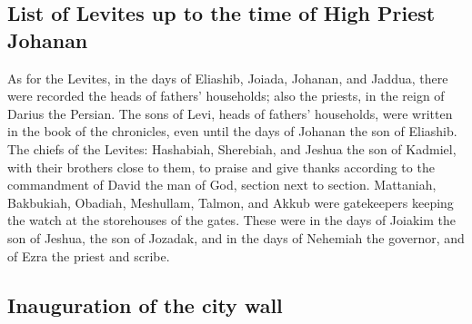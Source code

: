 \hypertarget{list-of-levites-up-to-the-time-of-high-priest-johanan}{%
\subsection{List of Levites up to the time of High Priest
Johanan}\label{list-of-levites-up-to-the-time-of-high-priest-johanan}}

 As for the Levites, in the days of Eliashib, Joiada,
Johanan, and Jaddua, there were recorded the heads of fathers'
households; also the priests, in the reign of Darius the Persian.
 The sons of Levi, heads of fathers' households, were
written in the book of the chronicles, even until the days of Johanan
the son of Eliashib.  The chiefs of the Levites:
Hashabiah, Sherebiah, and Jeshua the son of Kadmiel, with their brothers
close to them, to praise and give thanks according to the commandment of
David the man of God, section next to section. 
Mattaniah, Bakbukiah, Obadiah, Meshullam, Talmon, and Akkub were
gatekeepers keeping the watch at the storehouses of the gates.
 These were in the days of Joiakim the son of Jeshua, the
son of Jozadak, and in the days of Nehemiah the governor, and of Ezra
the priest and scribe.

\hypertarget{inauguration-of-the-city-wall}{%
\subsection{Inauguration of the city
wall}\label{inauguration-of-the-city-wall}}

